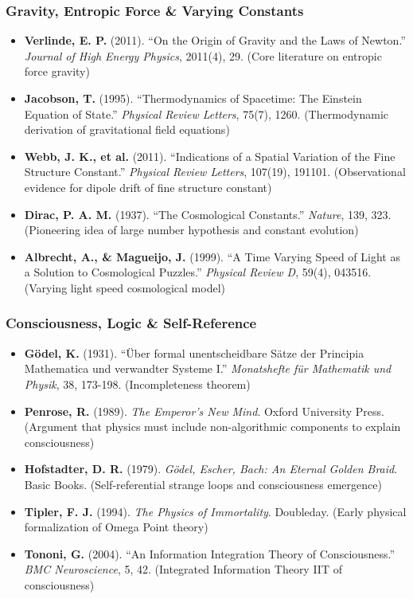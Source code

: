 \subsubsection{Gravity, Entropic Force \& Varying Constants}

\begin{itemize}
\item \textbf{Verlinde, E. P.} (2011). ``On the Origin of Gravity and the Laws of Newton.'' \textit{Journal of High Energy Physics}, 2011(4), 29. (Core literature on entropic force gravity)
\item \textbf{Jacobson, T.} (1995). ``Thermodynamics of Spacetime: The Einstein Equation of State.'' \textit{Physical Review Letters}, 75(7), 1260. (Thermodynamic derivation of gravitational field equations)
\item \textbf{Webb, J. K., et al.} (2011). ``Indications of a Spatial Variation of the Fine Structure Constant.'' \textit{Physical Review Letters}, 107(19), 191101. (Observational evidence for dipole drift of fine structure constant)
\item \textbf{Dirac, P. A. M.} (1937). ``The Cosmological Constants.'' \textit{Nature}, 139, 323. (Pioneering idea of large number hypothesis and constant evolution)
\item \textbf{Albrecht, A., \& Magueijo, J.} (1999). ``A Time Varying Speed of Light as a Solution to Cosmological Puzzles.'' \textit{Physical Review D}, 59(4), 043516. (Varying light speed cosmological model)
\end{itemize}

\subsubsection{Consciousness, Logic \& Self-Reference}

\begin{itemize}
\item \textbf{G\"{o}del, K.} (1931). ``\"{U}ber formal unentscheidbare S\"{a}tze der Principia Mathematica und verwandter Systeme I.'' \textit{Monatshefte f\"{u}r Mathematik und Physik}, 38, 173-198. (Incompleteness theorem)
\item \textbf{Penrose, R.} (1989). \textit{The Emperor's New Mind}. Oxford University Press. (Argument that physics must include non-algorithmic components to explain consciousness)
\item \textbf{Hofstadter, D. R.} (1979). \textit{G\"{o}del, Escher, Bach: An Eternal Golden Braid}. Basic Books. (Self-referential strange loops and consciousness emergence)
\item \textbf{Tipler, F. J.} (1994). \textit{The Physics of Immortality}. Doubleday. (Early physical formalization of Omega Point theory)
\item \textbf{Tononi, G.} (2004). ``An Information Integration Theory of Consciousness.'' \textit{BMC Neuroscience}, 5, 42. (Integrated Information Theory IIT of consciousness)
\end{itemize}

